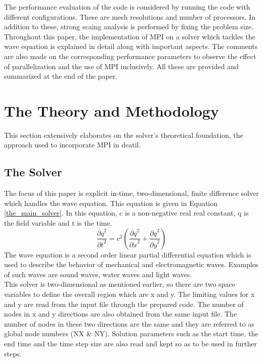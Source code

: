 \documentclass{article}
\begin{document}
The performance evaluation of the code is considered by running the code with different configurations. These are mesh resolutions and number of processors. In addition to these, strong scaing analysis is performed by fixing the problem size. \\

Throughout this paper, the implementation of MPI on a solver which tackles the wave equation is explained in detail along with important aspects. The comments are also made on the corresponding performance parameters to observe the effect of parallelization and the use of MPI inclusively. All these are provided and summarized at the end of the paper. 

\clearpage 

\section{The Theory and Methodology} 
This section extensively elaborates on the solver's theoretical foundation, the approach used to incorporate MPI in deatil. 
\subsection{The Solver}
The focus of this paper is explicit in-time, two-dimensional, finite difference solver which handles the wave equation. This equation is given in Equation \ref{the_main_solver}. In this equation, c is a non-negative real real constant, q is the field variable and t is the time. 
\begin{equation}  
    \frac{{\partial q}^2}{{\partial t}^2} = c^2 \left(\frac{{\partial q}^2}{{\partial x}^2} + \frac{{\partial q}^2}{{\partial y}^2}\right)
    \label{the_main_solver}
\end{equation}
The wave equation is a second order linear partial differential equation which is used to describe the behavior of mechanical and electromagnetic waves. Examples of such waves are sound waves, water waves and light waves. \\

This solver is two-dimensional as mentioned earlier, so there are two space variables to define the overall region which are x and y. The limiting values for x and y are read from the input file through the prepared code. The number of nodes in x and y directions are also obtained from the same input file. The number of nodes in these two directions are the same and they are referred to as global node numbers (NX \& NY). Solution parameters such as the start time, the end time and the time step size are also read and kept so as to be used in further steps. \\
\end{document}
